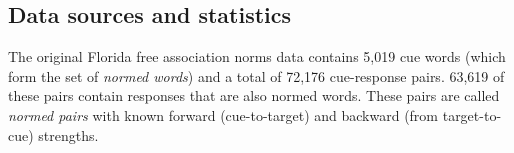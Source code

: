 %
\subsection{Data sources and statistics}
\label{sec:statistics}

The original Florida free association norms data
contains 5,019 cue words (which form the set of {\em normed words})
and a total of 72,176 cue-response pairs.
63,619 of these pairs contain responses that are also normed words.
These pairs are called {\em normed pairs} 
with known forward (cue-to-target) and backward (from target-to-cue) strengths.


